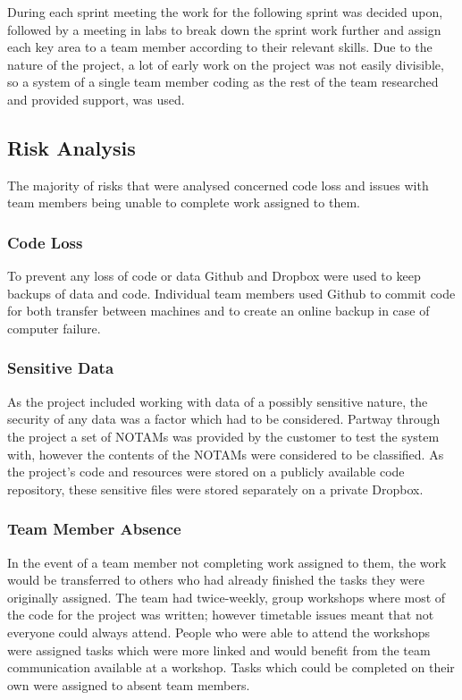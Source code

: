 \documentclass[a4paper, 12pt, twoside]{article}
\begin{document}
During each sprint meeting the work for the following sprint was decided upon, followed by a meeting in labs to break down the sprint work further and assign each key area to a team member according to their relevant skills. Due to the nature of the project, a lot of early work on the project was not easily divisible, so a system of a single team member coding as the rest of the team researched and provided support, was used.

\subsection{Risk Analysis}
\label{sec:plan_risk_analysis}

The majority of risks that were analysed concerned code loss and issues with team members being unable to complete work assigned to them.

\subsubsection{Code Loss}

To prevent any loss of code or data Github and Dropbox were used to keep backups of data and code. Individual team members used Github to commit code for both transfer between machines and to create an online backup in case of computer failure.

\subsubsection{Sensitive Data}

As the project included working with data of a possibly sensitive nature, the security of any data was a factor which had to be considered. Partway through the project a set of NOTAMs was provided by the customer to test the system with, however the contents of the NOTAMs were considered to be classified. As the project's code and resources were stored on a publicly available code repository, these sensitive files were stored separately on a private Dropbox.

\subsubsection{Team Member Absence}

In the event of a team member not completing work assigned to them, the work would be transferred to others who had already finished the tasks they were originally assigned. The team had twice-weekly, group workshops where most of the code for the project was written; however timetable issues meant that not everyone could always attend. People who were able to attend the workshops were assigned tasks which were more linked and would benefit from the team communication available at a workshop. Tasks which could be completed on their own were assigned to absent team members.
\end{document}

